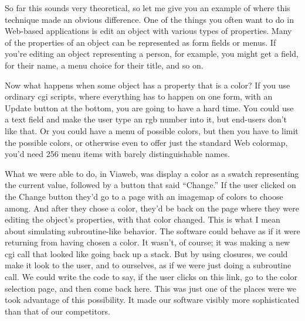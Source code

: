 So far this sounds very theoretical, so let me give you an example of
where this technique made an obvious difference. One of the things you
often want to do in Web-based applications is edit an object with
various types of properties. Many of the properties of an object can be
represented as form fields or menus. If you're editing an object
representing a person, for example, you might get a field, for their
name, a menu choice for their title, and so on.

Now what happens when some object has a property that is a color? If you
use ordinary cgi scripts, where everything has to happen on one form,
with an Update button at the bottom, you are going to have a hard time.
You could use a text field and make the user type an rgb number into it,
but end-users don't like that. Or you could have a menu of possible
colors, but then you have to limit the possible colors, or otherwise
even to offer just the standard Web colormap, you'd need 256 menu items
with barely distinguishable names.

What we were able to do, in Viaweb, was display a color as a swatch
representing the current value, followed by a button that said
``Change.'' If the user clicked on the Change button they'd go to a page
with an imagemap of colors to choose among. And after they chose a
color, they'd be back on the page where they were editing the object's
properties, with that color changed. This is what I mean about
simulating subroutine-like behavior. The software could behave as if it
were returning from having chosen a color. It wasn't, of course; it was
making a new cgi call that looked like going back up a stack. But by
using closures, we could make it look to the user, and to ourselves, as
if we were just doing a subroutine call. We could write the code to say,
if the user clicks on this link, go to the color selection page, and
then come back here. This was just one of the places were we took
advantage of this possibility. It made our software visibly more
sophisticated than that of our competitors.
